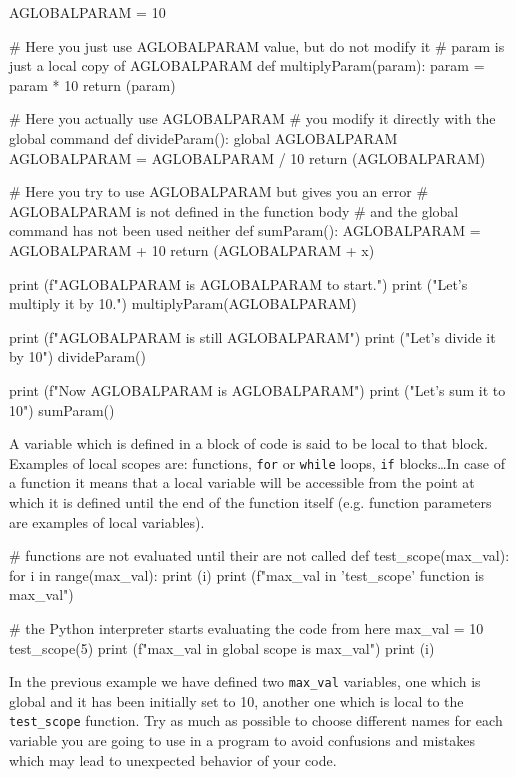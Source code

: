 \begin{ipython}
AGLOBALPARAM = 10

# Here you just use AGLOBALPARAM value, but do not modify it
# param is just a local copy of AGLOBALPARAM
def multiplyParam(param):
    param = param * 10
    return (param)

# Here you actually use AGLOBALPARAM
# you modify it directly with the global command
def divideParam():
    global AGLOBALPARAM
    AGLOBALPARAM = AGLOBALPARAM / 10
    return (AGLOBALPARAM)

# Here you try to use AGLOBALPARAM but gives you an error
# AGLOBALPARAM is not defined in the function body
# and the global command has not been used neither
def sumParam():
    AGLOBALPARAM = AGLOBALPARAM + 10
    return (AGLOBALPARAM + x)

print (f"AGLOBALPARAM is {AGLOBALPARAM} to start.")
print ("Let's multiply it by 10.")
multiplyParam(AGLOBALPARAM)

print (f"AGLOBALPARAM is still {AGLOBALPARAM}")
print ("Let's divide it by 10")
divideParam()

print (f"Now AGLOBALPARAM is {AGLOBALPARAM}")
print ("Let's sum it to 10")
sumParam()
\end{ipython}

A variable which is defined in a block of code is said to be local to that block. Examples of local scopes are: functions, \texttt{for} or \texttt{while} loops, \texttt{if} blocks\ldots In case of a function it means that a local variable will be accessible from the point at which it is defined until the end of the function itself (e.g. function parameters are examples of local variables).

\begin{ipython}
# functions are not evaluated until their are not called
def test_scope(max_val):
    for i in range(max_val):
        print (i)
    print (f"max_val in 'test_scope' function is {max_val}")

# the Python interpreter starts evaluating the code from here
max_val = 10
test_scope(5)
print (f"max_val in global scope is {max_val}")
print (i)
\end{ipython}

In the previous example we have defined two \texttt{max\_val} variables, one which is global and it has been initially set to 10, another one which is local to the \texttt{test\_scope} function.
Try as much as possible to choose different names for each variable you are going to use in a program to avoid confusions and mistakes which may lead to unexpected behavior of your code.

